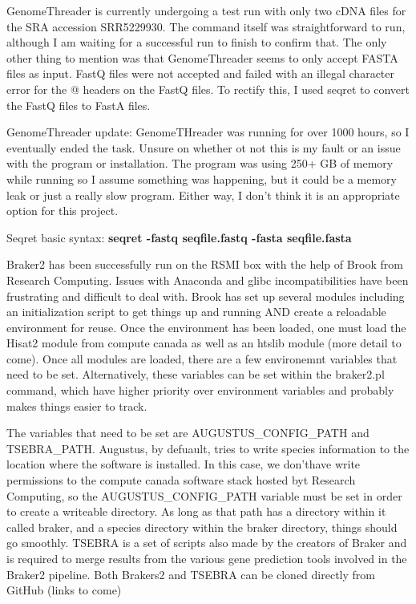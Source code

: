 \documentclass[12pt]{article}
\begin{document}
GenomeThreader is currently undergoing a test run with only two cDNA
files for the SRA accession SRR5229930. The command itself was
straightforward to run, although I am waiting for a successful run to
finish to confirm that. The only other thing to mention was that
GenomeThreader seems to only accept FASTA files as input. FastQ files
were not accepted and failed with an illegal character error for the @
headers on the FastQ files. To rectify this, I used seqret to convert
the FastQ files to FastA files.

GenomeThreader update: GenomeTHreader was running for over 1000 hours,
so I eventually ended the task. Unsure on whether ot not this is my
fault or an issue with the program or installation. The program was
using 250+ GB of memory while running so I assume something was
happening, but it could be a memory leak or just a really slow
program. Either way, I don't think it is an appropriate option for
this project.

Seqret basic syntax:
\textbf{seqret -fastq seqfile.fastq -fasta seqfile.fasta}


Braker2 has been successfully run on the RSMI box with the help of
Brook from Research Computing. Issues with Anaconda and glibc
incompatibilities have been frustrating and difficult to deal
with. Brook has set up several modules including an initialization
script to get things up and running AND create a reloadable
environment for reuse. Once the environment has been loaded, one must
load the Hisat2 module from compute canada as well as an htslib module
(more detail to come). Once all modules are loaded, there are a few
environemnt variables that need to be set. Alternatively, these
variables can be set within the braker2.pl command, which have higher
priority over environment variables and probably makes things easier
to track.

The variables that need to be set are AUGUSTUS_CONFIG_PATH and
TSEBRA_PATH. Augustus, by defuault, tries to write species information
to the location where the software is installed. In this case, we
don'thave write permissions to the compute canada software stack
hosted byt Research Computing, so the AUGUSTUS_CONFIG_PATH variable
must be set in order to create a writeable directory. As long as that
path has a directory within it called braker, and a species directory
within the braker directory, things should go smoothly. TSEBRA is a
set of scripts also made by the creators of Braker and is required to
merge results from the various gene prediction tools involved in the
Braker2 pipeline. Both Brakers2 and TSEBRA can be cloned directly from
GitHub (links to come)
\end{document}
